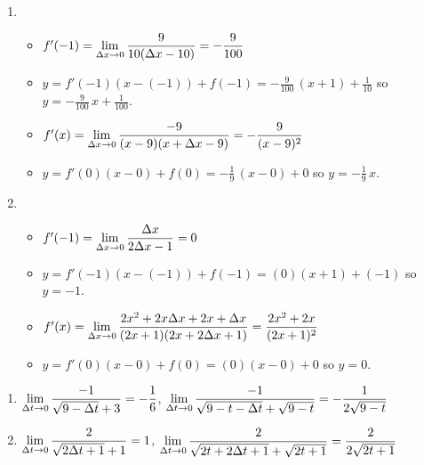 \begin{enumerate}
\setcounter{enumi}{\value{HW}}

\item   \begin{itemize}

\item  $f'(-1) = \displaystyle{ \lim_{\Delta x \rightarrow 0} \dfrac{9}{10(\Delta x - 10)} = -\dfrac{9}{100}}$

\smallskip

\item $y = f'(-1)(x-(-1)) + f(-1) = -\frac{9}{100} \, (x+1) + \frac{1}{10}$ so $y = - \frac{9}{100} \, x + \frac{1}{100}$.

\smallskip

\item  $f'(x) =\displaystyle{ \lim_{\Delta x \rightarrow 0} \dfrac{-9}{(x - 9)(x + \Delta x - 9)} =   -\dfrac{9}{(x-9)^2}}$   

\smallskip  

\item  $y = f'(0)(x-0) + f(0) = -\frac{1}{9} \, (x-0)+0$ so $y = -\frac{1}{9} \, x$.

\smallskip

\end{itemize}

\item \begin{itemize}  

\item  $f'(-1) = \displaystyle{ \lim_{\Delta x \rightarrow 0} \dfrac{\Delta x}{2 \Delta x - 1} = 0}$

\smallskip

\item $y = f'(-1)(x-(-1)) + f(-1) = (0) (x+1) + (-1)$ so $y = -1$.

\smallskip

\item  $f'(x) =\displaystyle{ \lim_{\Delta x \rightarrow 0}\dfrac{2x^2+2x\Delta x+2x+\Delta x}{(2x+1)(2x+2\Delta x+1)}=  \dfrac{2x^2+2x}{(2x+1)^2}}$

\smallskip

\item  $y = f'(0)(x-0) + f(0) = (0)(x-0)+0$ so $y = 0$.

\smallskip

\end{itemize}


\setcounter{HW}{\value{enumi}}
\end{enumerate}

\begin{enumerate}
\setcounter{enumi}{\value{HW}}

\item  $\displaystyle{ \lim_{\Delta t \rightarrow 0}\dfrac{-1}{\sqrt{9-\Delta t} +3}  = -\dfrac{1}{6}}$,   $\displaystyle{ \lim_{\Delta t \rightarrow 0} \dfrac{-1}{\sqrt{9-t-\Delta t} + \sqrt{9-t}}=   -\dfrac{1}{2 \sqrt{9-t}}}$   
\item  $\displaystyle{ \lim_{\Delta t \rightarrow 0}\dfrac{2}{\sqrt{2\Delta t+1} + 1}  =1}$,   $\displaystyle{ \lim_{\Delta t \rightarrow 0}\dfrac{2}{\sqrt{2t+2\Delta t+1} + \sqrt{2t+1}}=   \dfrac{2}{2 \sqrt{2t+1}}}$    

\setcounter{HW}{\value{enumi}}
\end{enumerate}

